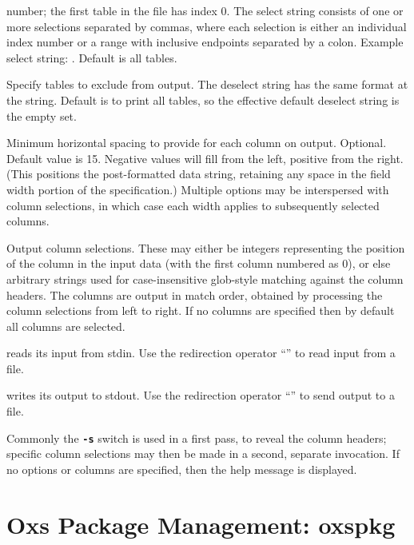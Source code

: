 \begin{description}
  number; the first table in the file has index 0.  The select string
  consists of one or more selections separated by commas, where each
  selection is either an individual index number or a range with
  inclusive endpoints separated by a colon.  Example select string:
  .  Default is all tables.
\item[\optkey{-no-table deselect}]
  Specify tables to exclude from output.  The deselect string has the
  same format at the  string.  Default is to print all
  tables, so the effective default deselect string is the empty set.
\item[\optkey{-w colwidth}]
  Minimum horizontal spacing to provide for each column on output.
  Optional.  Default value is 15. Negative  values will
  fill from the left, positive from the right. (This positions the
  post-formatted data string, retaining any space in the field width
  portion of the  specification.) Multiple 
  options may be interspersed with column selections, in which case each
  width applies to subsequently selected columns.
\item[\optkey{col \ldots}]
  Output column selections.  These may either be integers representing
  the position of the column in the input data (with the first column
  numbered as 0), or else arbitrary strings used for case-insensitive
  glob-style matching against the column headers.  The columns are
  output in match order, obtained by processing the column selections
  from left to right.  If no columns are specified then by default all
  columns are selected.
\item[\optkey{\boa infile}]
   reads its input from stdin.  Use the redirection operator
  ``\boa'' to read input from a file.
\item[\optkey{\bca outfile}]
   writes its output to stdout.  Use the redirection operator
  ``\bca'' to send output to a file.
\end{description}
Commonly the \texttt{\textbf{-s}} switch is used in a first pass, to
reveal the column headers; specific column selections may then be made
in a second, separate invocation.  If no options or columns are
specified, then the help message is displayed.


\section{Oxs Package Management:
            oxspkg\label{sec:oxspkg}}%


